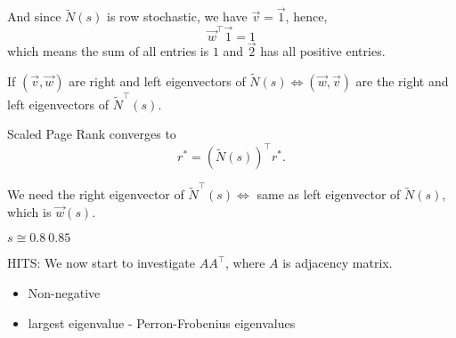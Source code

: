 And since \(\widetilde{N}(s)\) is row stochastic, we have \(\vec{v} = \vec{1}\), hence,
\[
	\vec{w}^{\top}\vec{1} = 1
\]
which means the sum of all entries is \(1\) and \(\vec{2}\) has all positive entries.

If \((\vec{v}, \vec{w})\) are right and left eigenvectors of \(\widetilde{N}(s) \iff (\vec{w}, \vec{v})\) are the right and left eigenvectors
of \(\widetilde{N}^{\top}(s)\).

Scaled Page Rank converges to
\[
	r^{\ast} = (\widetilde{N}(s))^{\top}r^{\ast}.
\]

We need the right eigenvector of \(\widetilde{N}^{\top}(s) \iff \) same as left eigenvector of \(\widetilde{N}(s)\), which is \(\vec{w}(s)\).

\begin{remark}
	\(s \cong 0.8 ~ 0.85\)
\end{remark}

\begin{prev}
	HITS: We now start to investigate \(A A^{\top}\), where \(A\) is adjacency matrix.
	\begin{itemize}
		\item Non-negative
		\item largest eigenvalue - Perron-Frobenius eigenvalues
	\end{itemize}
\end{prev}
